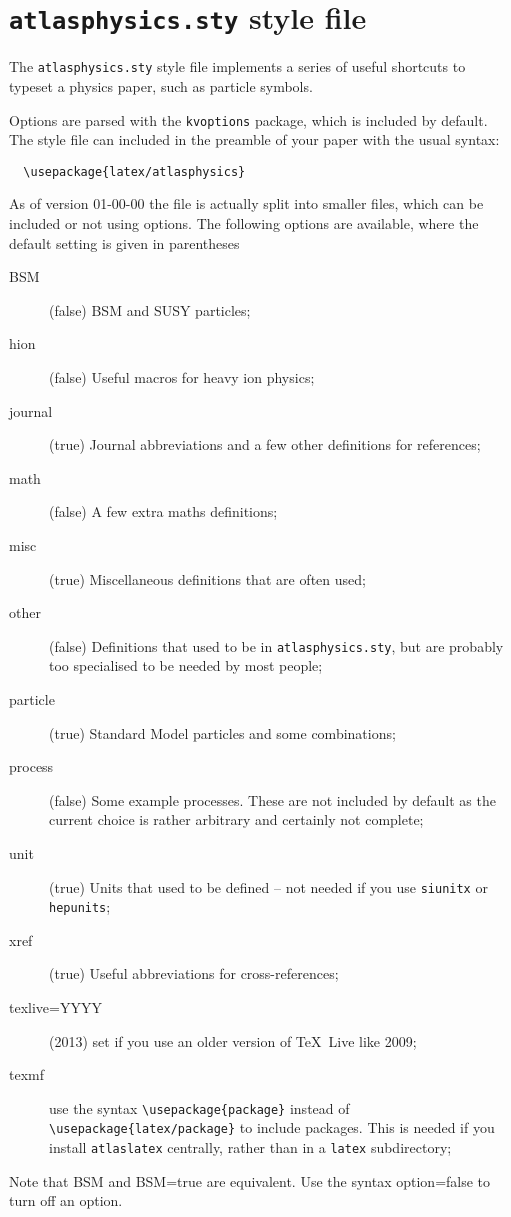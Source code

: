 \documentclass[UKenglish,texlive=2013]{latex/atlasdoc}
\author{Ian C. Brock}
\affil{University of Bonn}
\newcommand{\File}[1]{\texttt{#1}\xspace}
\newcommand{\Macro}[1]{\texttt{\textbackslash #1}\xspace}
\newcommand{\Option}[1]{\textsf{#1}\xspace}
\newcommand{\Package}[1]{\texttt{#1}\xspace}
\begin{document}
\maketitle

\tableofcontents

\section{\File{atlasphysics.sty} style file}
\label{sec:atlasphysics}

The \File{atlasphysics.sty} style file implements a series of useful
shortcuts to typeset a physics paper, such as particle
symbols.

Options are parsed with the \Package{kvoptions} package, which is included by default.
The style file can included in the preamble of your paper with the usual
syntax:
%
\begin{verbatim}
  \usepackage{latex/atlasphysics}
\end{verbatim}
%
As of version 01-00-00 the file is actually split into smaller files,
which can be included or not using options.
The following options are available, where the default setting is given in parentheses
\begin{description}
\item[BSM](false) BSM and SUSY particles;
\item[hion](false) Useful macros for heavy ion physics;
\item[journal](true) Journal abbreviations and a few other definitions for references;
\item[math](false) A few extra maths definitions;
\item[misc](true) Miscellaneous definitions that are often used;
\item[other](false) Definitions that used to be in \File{atlasphysics.sty}, 
  but are probably too specialised to be needed by most people;
\item[particle](true) Standard Model particles and some combinations;
\item[process](false) Some example processes. 
  These are not included by default as the current choice is rather arbitrary
  and certainly not complete;
\item[unit](true) Units that used to be defined -- not needed if you use \Package{siunitx} or \Package{hepunits};
\item[xref](true) Useful abbreviations for cross-references;
\item[texlive=YYYY](2013) set if you use an older version of \TeX\ Live like 2009;
\item[texmf] use the syntax \Macro{usepackage\{package\}}
  instead of \Macro{usepackage\{latex/package\}} to include packages.
  This is needed if you install \Package{atlaslatex} centrally,
  rather than in a \File{latex} subdirectory;
\end{description}
Note that \Option{BSM} and \Option{BSM=true} are equivalent.
Use the syntax \Option{option=false} to turn off an option.
\end{document}
